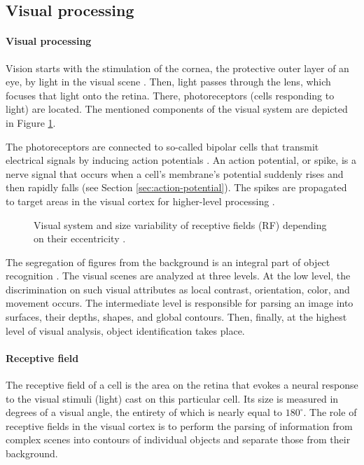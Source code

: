 \subsection{Visual processing}

\paragraph{Visual processing}

Vision starts with the stimulation of the cornea, the protective outer layer of an eye, by light in the visual scene \cite{KandelBook2003:26}. Then, light passes through the lens, which focuses that light onto the retina. There, photoreceptors (cells responding to light) are located. The mentioned components of the visual system are depicted in Figure \ref{fig:receptive-field}. 

The photoreceptors are connected to so-called bipolar cells that transmit electrical signals by inducing action potentials \cite{IzhikevichBook2004:2}. An action potential, or spike, is a nerve signal that occurs when a cell's membrane's potential suddenly rises and then rapidly falls (see Section \ref{sec:action-potential}). The spikes are propagated to target areas in the visual cortex for higher-level processing \cite{KandelBook2003:26}.

\begin{figure}[!htp]
    \centering
    
    \caption[Visual system and size variability of receptive fields]{Visual system and size variability of receptive fields (RF) depending on their eccentricity \cite{KandelBook2003:25}.}
    \label{fig:receptive-field}
\end{figure}

The segregation of figures from the background is an integral part of object recognition \cite{KandelBook2003:25}. The visual scenes are analyzed at three levels. At the low level, the discrimination on such visual attributes as local contrast, orientation, color, and movement occurs. The intermediate level is responsible for parsing an image into surfaces, their depths, shapes, and global contours. Then, finally, at the highest level of visual analysis, object identification takes place.

\paragraph{Receptive field}

The receptive field of a cell is the area on the retina that evokes a neural response to the visual stimuli (light) cast on this particular cell. Its size is measured in degrees of a visual angle, the entirety of which is nearly equal to $180^\circ$. The role of receptive fields in the visual cortex is to perform the parsing of information from complex scenes into contours of individual objects and separate those from their background.

